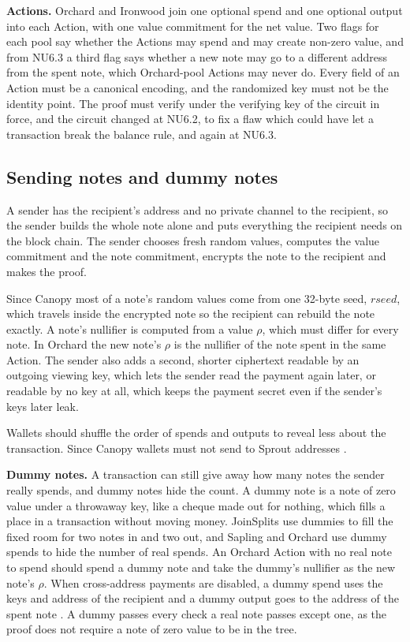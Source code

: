 \documentclass{article}
\let\oldcite\cite
\renewcommand{\cite}[2][]{\raisebox{0ex}{\oldcite[{#1}]{#2}}}
\newcommand{\lsubsection}[2]{\def\sectionlabel{#2} \subsection{#1}\label{#2}}
\theoremstyle{labelledtheorem} %
\begin{document}
\textbf{Actions.} Orchard and Ironwood join one optional spend and one optional output into each Action, with one value commitment for the net value. Two flags for each pool say whether the Actions may spend and may create non-zero value, and from NU6.3 a third flag says whether a new note may go to a different address from the spent note, which Orchard-pool Actions may never do. Every field of an Action must be a canonical encoding, and the randomized key must not be the identity point. The proof must verify under the verifying key of the circuit in force, and the circuit changed at NU6.2, to fix a flaw which could have let a transaction break the balance rule, and again at NU6.3.

\lsubsection{Sending notes and dummy notes}{readablesending}
\label{sproutdummynotes}%

A sender has the recipient's address and no private channel to the recipient, so the sender builds the whole note alone and puts everything the recipient needs on the block chain. The sender chooses fresh random values, computes the value commitment and the note commitment, encrypts the note to the recipient and makes the proof.

Since Canopy most of a note's random values come from one 32-byte seed, $\mathit{rseed}$, which travels inside the encrypted note so the recipient can rebuild the note exactly. A note's nullifier is computed from a value $\rho$, which must differ for every note. In Orchard the new note's $\rho$ is the nullifier of the note spent in the same Action. The sender also adds a second, shorter ciphertext readable by an outgoing viewing key, which lets the sender read the payment again later, or readable by no key at all, which keeps the payment secret even if the sender's keys later leak.

Wallets should shuffle the order of spends and outputs to reveal less about the transaction. Since Canopy wallets must not send to Sprout addresses \cite{ZIP-211}.

\textbf{Dummy notes.} A transaction can still give away how many notes the sender really spends, and dummy notes hide the count. A dummy note is a note of zero value under a throwaway key, like a cheque made out for nothing, which fills a place in a transaction without moving money. JoinSplits use dummies to fill the fixed room for two notes in and two out, and Sapling and Orchard use dummy spends to hide the number of real spends. An Orchard Action with no real note to spend should spend a dummy note and take the dummy's nullifier as the new note's $\rho$. When cross-address payments are disabled, a dummy spend uses the keys and address of the recipient and a dummy output goes to the address of the spent note \cite{ZIP-326}. A dummy passes every check a real note passes except one, as the proof does not require a note of zero value to be in the tree.
\end{document}

